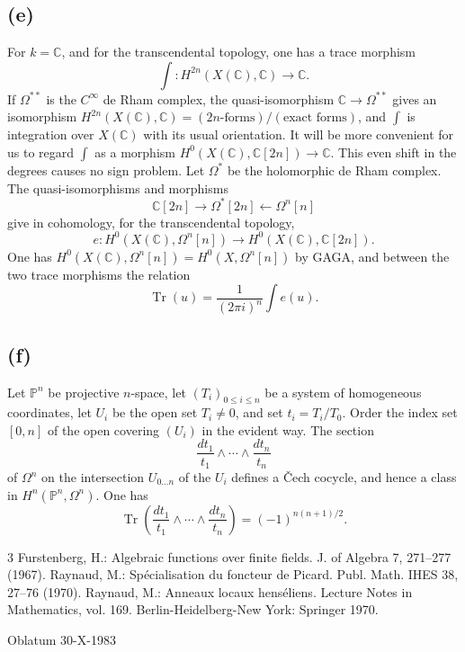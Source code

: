 \documentclass[11pt]{article}
\DeclareMathOperator{\Tr}{Tr}
\newcommand{\CC}{\mathbb C}
\newcommand{\PP}{\mathbb P}
\begin{document}
\subsection*{(e)}
For $k=\CC$, and for the transcendental topology, one has a trace morphism
\[
        \int:H^{2n}(X(\CC),\CC)\longrightarrow\CC.
\]
If $\Omega^{**}$ is the $C^\infty$ de Rham complex, the quasi-isomorphism $\CC\to\Omega^{**}$ gives an isomorphism $H^{2n}(X(\CC),\CC)=(2n\text{-forms})/(\text{exact forms})$, and $\int$ is integration over $X(\CC)$ with its usual orientation. It will be more convenient for us to regard $\int$ as a morphism $H^0(X(\CC),\CC[2n])\to\CC$. This even shift in the degrees causes no sign problem. Let $\Omega^*$ be the holomorphic de Rham complex. The quasi-isomorphisms and morphisms
\[
        \CC[2n]\longrightarrow\Omega^*[2n]\longleftarrow\Omega^n[n]
\]
give in cohomology, for the transcendental topology,
\[
        e:H^0(X(\CC),\Omega^n[n])\longrightarrow H^0(X(\CC),\CC[2n]).
\]
One has $H^0(X(\CC),\Omega^n[n])=H^0(X,\Omega^n[n])$ by GAGA, and between the two trace morphisms the relation
\[
        \Tr(u)=\frac{1}{(2\pi i)^n}\int e(u).
\]

\subsection*{(f)}
Let $\PP^n$ be projective $n$-space, let $(T_i)_{0\le i\le n}$ be a system of homogeneous coordinates, let $U_i$ be the open set $T_i\ne0$, and set $t_i=T_i/T_0$. Order the index set $[0,n]$ of the open covering $(U_i)$ in the evident way. The section
\[
        \frac{dt_1}{t_1}\wedge\cdots\wedge\frac{dt_n}{t_n}
\]
of $\Omega^n$ on the intersection $U_{0\ldots n}$ of the $U_i$ defines a Čech cocycle, and hence a class in $H^n(\PP^n,\Omega^n)$. One has
\[
        \Tr\left(\frac{dt_1}{t_1}\wedge\cdots\wedge\frac{dt_n}{t_n}\right)
        =(-1)^{n(n+1)/2}.
\]

\begin{thebibliography}{3}
 Furstenberg, H.: Algebraic functions over finite fields. J. of Algebra 7, 271--277 (1967).
 Raynaud, M.: Spécialisation du foncteur de Picard. Publ. Math. IHES 38, 27--76 (1970).
 Raynaud, M.: Anneaux locaux henséliens. Lecture Notes in Mathematics, vol. 169. Berlin-Heidelberg-New York: Springer 1970.
\end{thebibliography}

\bigskip
\begin{center}
Oblatum 30-X-1983
\end{center}
\end{document}
